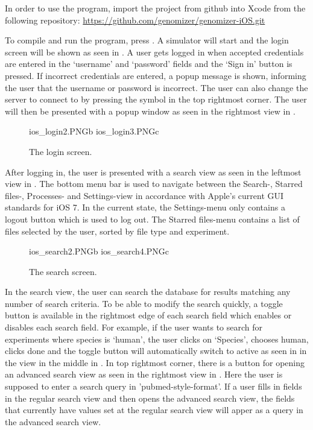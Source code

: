 In order to use the program, import the project from github into Xcode from the following repository:
\url{https://github.com/genomizer/genomizer-iOS.git} 

To compile and run the program, press . A simulator will start and the login screen will be shown as seen in . A user gets logged in when accepted credentials are entered in the ‘username’ and ‘password’ fields and the ‘Sign in’ button is pressed. If incorrect credentials are entered, a popup message is shown, informing the user that the username or password is incorrect. The user can also change  the server to connect to by pressing the symbol in the top rightmost corner. The user will then be presented with a popup window as seen in the rightmost view in .

\begin{figure}[ht]
		{ios_login2.PNG}{b}
		{ios_login3.PNG}{c}
\caption{The login screen.}
\label{fig:ios_login}
\end{figure}
\FloatBarrier
After logging in, the user is presented with a search view as seen in the leftmost view in . The bottom menu bar is used to navigate between the Search-, Starred files-, Processes- and Settings-view in accordance with Apple's current GUI standards for iOS 7. In the current state, the Settings-menu only contains a logout button which is used to log out. The Starred files-menu contains a list of files selected by the user, sorted by file type and experiment.
\begin{figure}[ht]
		{ios_search2.PNG}{b}
		{ios_search4.PNG}{c}
\caption{The search screen.}
\label{fig:ios_search}
\end{figure}
\FloatBarrier
In the search view, the user can search the database for results matching any number of search criteria. To be able to modify the search quickly, a toggle button is available in the rightmost edge of each search field which enables or disables each search field. For example, if the user wants to search for experiments where species is ‘human’, the user clicks on ‘Species’, chooses human, clicks done and the toggle button will automatically switch to active as seen in in the view in the middle in .
In top rightmost corner, there is a button for opening an advanced search view as seen in the rightmost view in . Here the user is supposed to enter a search query in ’pubmed-style-format’. If a user fills in fields in the regular search view and then opens the advanced search view, the fields that currently have values set at the regular search view will apper as a query in the advanced search view.

